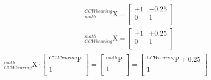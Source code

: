 \documentclass[12pt,fleqn]{standalone}
\begin{document}
\begin{preview}
\Large
\[
\begin{aligned}
{\displaystyle _{math}^{CCW bearing}\textrm{X}=
\begin{bmatrix}
+1 & -0.25 \\
0 & 1 \\
\end{bmatrix}}\\
{\displaystyle _{CCW bearing}^{math}\textrm{X}=
\begin{bmatrix}
+1 & +0.25 \\
0 & 1 \\
\end{bmatrix}}\\
\end{aligned}
\]
${\displaystyle _{CCWbearing}^{math}\textrm{X} \cdot \begin{bmatrix}
		_{}^{CCWbearing}\textrm{P} \\
		1 \\
	\end{bmatrix}=\begin{bmatrix}
		_{}^{math}\textrm{P} \\
		1 \\
\end{bmatrix}=\begin{bmatrix}
_{}^{CCWbearing}\textrm{P}+0.25 \\
1 \\
\end{bmatrix}}$
\end{preview}
\end{document}

